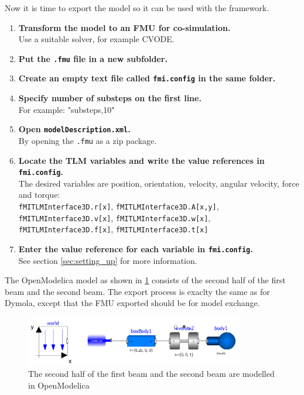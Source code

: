 \documentclass[11pt,a4paper]{report}
\begin{document}
Now it is time to export the model so it can be used with the framework.
\begin{enumerate}
\item \textbf{Transform the model to an FMU for co-simulation.}\\
      Use a suitable solver, for example CVODE.
\item \textbf{Put the \texttt{.fmu} file in a new subfolder.}
\item \textbf{Create an empty text file called \texttt{fmi.config} in the same folder.}
\item \textbf{Specify number of substeps on the first line.}\\
              For example: "substeps,10"
\item \textbf{Open \texttt{modelDescription.xml}.}\\
              By opening the \texttt{.fmu} as a zip package.
\item \textbf{Locate the TLM variables and write the value references in \texttt{fmi.config}.}\\
              The desired variables are position, orientation, velocity, angular velocity, force and torque:\\
              \texttt{fMITLMInterface3D.r[x]}, \texttt{fMITLMInterface3D.A[x,y]},\\
              \texttt{fMITLMInterface3D.v[x]}, \texttt{fMITLMInterface3D.w[x]},\\
              \texttt{fMITLMInterface3D.f[x]}, \texttt{fMITLMInterface3D.t[x]}
\item \textbf{Enter the value reference for each variable in \texttt{fmi.config}.}\\
              See section \cref{sec:setting_up} for more information.              
\end{enumerate}

The OpenModelica model as shown in \cref{fig:model_omedit} consists of the second half of the first beam and the second beam.
The export process is exaclty the same as for Dymola, except that the FMU exported should be for model exchange.

\begin{figure}[ht]
\centering
\includegraphics[width=0.85\textwidth]{gfx/model_omedit.png}
\caption{The second half of the first beam and the second beam  are modelled in OpenModelica}
\label{fig:model_omedit}
\end{figure}
\end{document}
